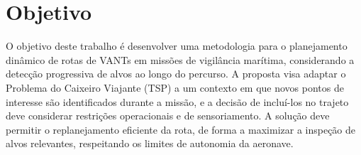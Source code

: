 \section{Objetivo}
O objetivo deste trabalho é desenvolver uma metodologia para o planejamento dinâmico de rotas de VANTs em missões de vigilância marítima, considerando a detecção progressiva de alvos ao longo do percurso. A proposta visa adaptar o Problema do Caixeiro Viajante (TSP) a um contexto em que novos pontos de interesse são identificados durante a missão, e a decisão de incluí-los no trajeto deve considerar restrições operacionais e de sensoriamento. A solução deve permitir o replanejamento eficiente da rota, de forma a maximizar a inspeção de alvos relevantes, respeitando os limites de autonomia da aeronave.